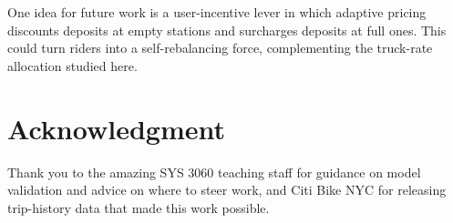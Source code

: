\documentclass[conference]{IEEEtran}
\begin{document}
 One idea for future work is a user-incentive lever in which adaptive pricing discounts deposits at empty stations and surcharges deposits at full ones. This could turn riders into a self-rebalancing force, complementing the truck-rate allocation studied here.
\section*{Acknowledgment}

Thank you to the amazing SYS 3060 teaching staff for guidance on model validation and advice on where to steer work, and Citi Bike NYC for releasing trip-history data that made this work possible.
\end{document}
